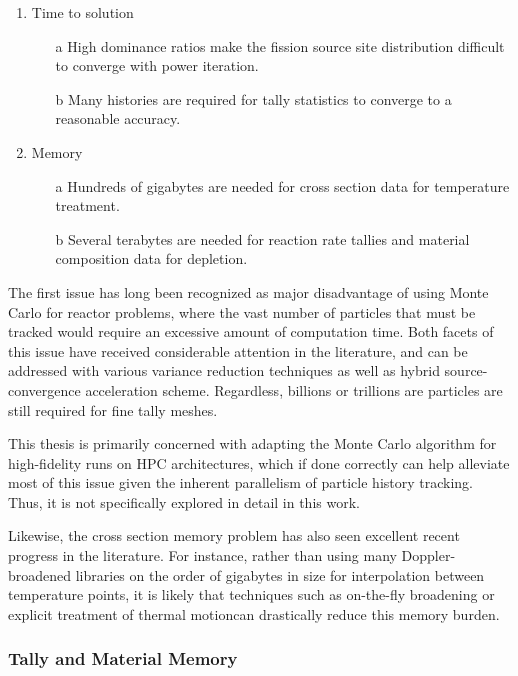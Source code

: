 \documentclass[12pt,twoside]{mitthesis-exec}
\begin{document}
\begin{enumerate}
  \item Time to solution
  \begin{itemize}
    \item[a] High dominance ratios make the fission source site distribution
        difficult to converge with power iteration.
    \item[b] Many histories are required for tally statistics to converge to a
        reasonable accuracy.
  \end{itemize}
  \item Memory
  \begin{itemize}
    \item[a] Hundreds of gigabytes are needed for cross section data for temperature treatment.
    \item[b] Several terabytes are needed for reaction rate tallies and material
        composition data for depletion.
  \end{itemize}
\end{enumerate}

The first issue has long been recognized as major disadvantage of using Monte
Carlo for reactor problems, where the vast number of particles that must be
tracked would require an excessive amount of computation time. Both facets of
this issue have received considerable attention in the literature, and can be
addressed with various variance reduction techniques as well as hybrid
source-convergence acceleration scheme. Regardless, billions or trillions are
particles are still required for fine tally meshes.

This thesis is primarily concerned with adapting the Monte Carlo algorithm
for high-fidelity runs on HPC architectures, which if done correctly can help
alleviate most of this issue given the inherent parallelism of particle history
tracking. Thus, it is not specifically explored in detail in this work.

Likewise, the cross section memory problem has also seen excellent recent
progress in the literature. For instance, rather than using many
Doppler-broadened libraries on the order of gigabytes in size for interpolation
between temperature points, it is likely that techniques such as on-the-fly
broadening or explicit treatment of thermal motioncan drastically reduce this
memory burden.

\subsubsection*{Tally and Material Memory}
\end{document}
